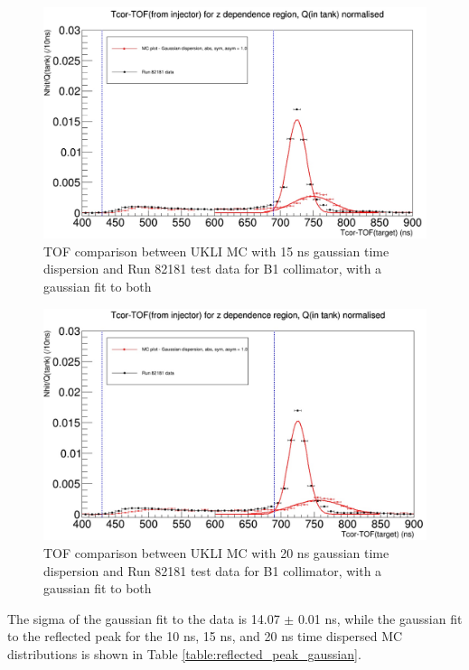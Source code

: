\begin{figure}
    \centering
    \includegraphics[width=\textwidth]{Figures/Inked15ns_gaussian_dispersion_with_fit.jpg}
    \caption{TOF comparison between UKLI MC with 15 ns gaussian time dispersion and Run 82181 test data for B1 collimator, with a gaussian fit to both}
    \label{fig:15ns_time_dispersion}
\end{figure}

\begin{figure}
    \centering
    \includegraphics[width=\textwidth]{Figures/Inked20ns_gaussian_dispersion_with_fit.jpg}
    \caption{TOF comparison between UKLI MC with 20 ns gaussian time dispersion and Run 82181 test data for B1 collimator, with a gaussian fit to both}
    \label{fig:20ns_time_dispersion}
\end{figure}


The sigma of the gaussian fit to the data is 14.07 $\pm$ 0.01 ns, while the gaussian fit to the reflected peak for the 10 ns, 15 ns, and 20 ns time dispersed MC distributions is shown in Table \ref{table:reflected_peak_gaussian}. 

